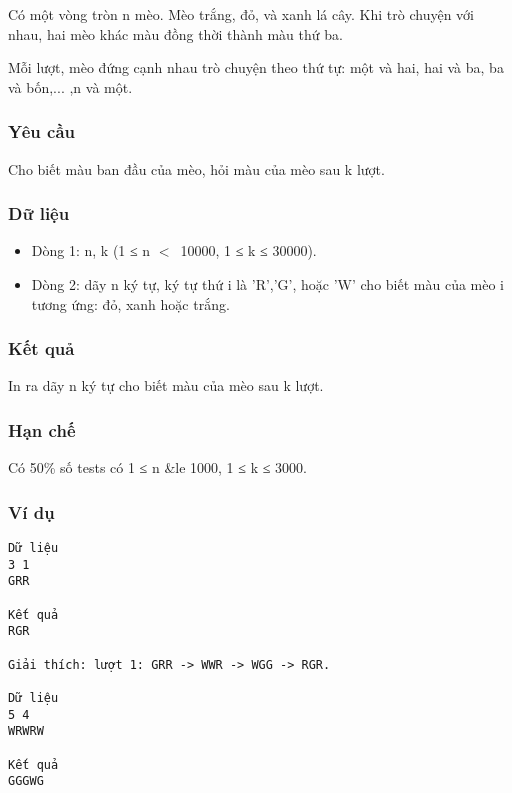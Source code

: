 

Có một vòng tròn n mèo. Mèo trắng, đỏ, và xanh lá cây. Khi trò chuyện với nhau, hai mèo khác màu đồng thời thành màu thứ ba.

Mỗi lượt, mèo đứng cạnh nhau trò chuyện theo thứ tự: một và hai, hai và ba, ba và bốn,... ,n và một.

\subsubsection{Yêu cầu}

Cho biết màu ban đầu của mèo, hỏi màu của mèo sau k lượt.

\subsubsection{Dữ liệu}
\begin{itemize}
	\item Dòng 1: n, k (1 ≤ n $<$ 10000, 1 ≤ k ≤ 30000).
	\item Dòng 2: dãy n ký tự, ký tự thứ i là 'R','G', hoặc 'W' cho biết màu của mèo i tương ứng: đỏ, xanh hoặc trắng.
\end{itemize}

\subsubsection{Kết quả}

In ra dãy n ký tự cho biết màu của mèo sau k lượt.

\subsubsection{Hạn chế}

Có 50\% số tests có 1 ≤ n \&le 1000, 1 ≤ k ≤ 3000.

\subsubsection{Ví dụ}
\begin{verbatim}
Dữ liệu
3 1
GRR

Kết quả 
RGR

Giải thích: lượt 1: GRR -> WWR -> WGG -> RGR.

Dữ liệu
5 4
WRWRW

Kết quả 
GGGWG
\end{verbatim}
